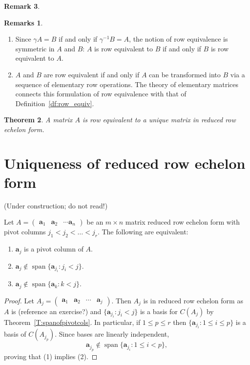 \documentclass[12pt]{amsart}
\newtheorem{theorem}{Theorem}[section]
\theoremstyle{definition} \newtheorem{definition}[theorem]{Definition}
\newtheorem{remark}[theorem]{Remark} \newtheorem{remarks}[theorem]{Remarks}
\newcommand{\ba}{\mathbf{a}}
\DeclareMathOperator{\Span}{span}
\begin{document}
\begin{remark}
\begin{remarks}\hfill \begin{enumerate}
  \item Since $\gamma A=B$ if and only if
	$\gamma^{-1} B=A$, the notion of row equivalence is symmetric in $A$ and $B$: $A$ is row equivalent to $B$ if and only if $B$ is row equivalent to $A$.

  \item $A$ and $B$ are row equivalent if and only if $A$ can
	be transformed into $B$ via a sequence of elementary row operations.
	The theory of elementary matrices connects this formulation of row
	equivalence with that of Definition~\ref{df:row_equiv}.
	\end{enumerate}
\end{remarks}

\begin{theorem}\label{th:rref_existence_uniqueness}
  A matrix $A$ is row equivalent to a unique matrix in reduced row echelon form.
\end{theorem}

\section{Uniqueness of reduced row echelon form} (Under construction; do not read!)

\begin{lemma}\label{L:spanofcolstotheleft} Let $A=\begin{pmatrix}\ba_1&\ba_2&\cdots\ba_n\end{pmatrix}$ be an $m\times n$ matrix reduced row echelon form with pivot columns $j_1<j_2<\ldots<j_r$. The following are equivalent:
\begin{enumerate}
\item $\ba_j$ is a pivot column of $A$.
\item $\ba_j\notin \Span\{\ba_{j_i} : j_i<j\}$.
\item $\ba_j\notin \Span\{\ba_k : k<j\}$.
\end{enumerate}
\end{lemma}
\begin{proof}
Let $A_j=\begin{pmatrix}\ba_1&\ba_2&\cdots&\ba_j\end{pmatrix}$.
Then $A_j$ is in reduced row echelon form as $A$ is (reference an exercise?) and $\{\ba_{j_i}:j_i<j\}$ is a basis for $C(A_j)$ by Theorem~\ref{T:spanofpivotcols}.
In particular, if $1\leq p\leq r$ then $\{\ba_{j_i} : 1\leq i\leq p\}$ is a basis of $C(A_{j_p})$. Since bases are linearly independent,
\[
\ba_{j_p}\notin\Span\{\ba_{j_i}: 1\leq i<p\},
\]
proving that (1) implies (2).


\end{proof}
\end{remark}
\end{document}
